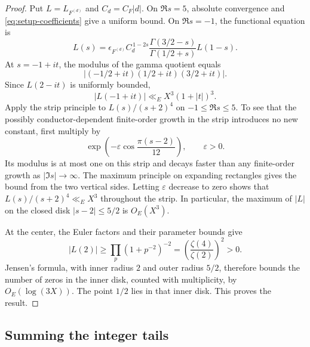 \begin{proof}
Put \(L=L_{F^{(d)}}\) and \(C_d=C_F|d|\).
On \(\Re s=5\), absolute convergence and
\eqref{eq:setup-coefficients} give a uniform bound.
On \(\Re s=-1\), the functional equation is
\[
 L(s)=\epsilon_{F^{(d)}} C_d^{\,1-2s}
          \frac{\Gamma(3/2-s)}{\Gamma(1/2+s)}L(1-s).
\]
At \(s=-1+it\), the modulus of the gamma quotient equals
\[
 |(-1/2+it)(1/2+it)(3/2+it)|.
\]
Since \(L(2-it)\) is uniformly bounded,
\[
 |L(-1+it)|\ll_E X^3(1+|t|)^3.
\]
Apply the strip principle to \(L(s)/(s+2)^4\) on
\(-1\le\Re s\le5\). To see that the possibly conductor-dependent
finite-order growth in the strip introduces no new constant, first
multiply by
\[
 \exp\!\left(-\varepsilon
       \cos\frac{\pi(s-2)}{12}\right),\qquad \varepsilon>0.
\]
Its modulus is at most one on this strip and decays faster than any
finite-order growth as \(|\Im s|\to\infty\).
The maximum principle on expanding rectangles gives the bound from
the two vertical sides. Letting \(\varepsilon\) decrease to zero shows
that \(L(s)/(s+2)^4\ll_E X^3\) throughout the strip.
In particular, the maximum of \(|L|\) on the closed disk
\(|s-2|\le5/2\) is \(O_E(X^3)\).

At the center, the Euler factors and their parameter bounds give
\[
 |L(2)|\ge \prod_p(1+p^{-2})^{-2}
          =\left(\frac{\zeta(4)}{\zeta(2)}\right)^2>0.
\]
Jensen's formula, with inner radius \(2\) and outer radius \(5/2\),
therefore bounds the number of zeros in the inner disk, counted with
multiplicity, by \(O_E(\log(3X))\).
The point \(1/2\) lies in that inner disk. This proves the result.
\end{proof}

\subsection{Summing the integer tails}

